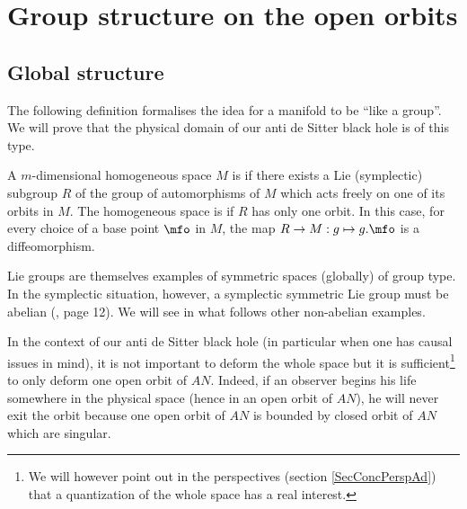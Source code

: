 \section{Group structure on the open orbits}
\label{SecGpStructOuvertOrb}

 \subsection{Global structure}

The following definition formalises the idea for a manifold to be ``like a group''. We will prove that the physical domain of our anti de Sitter black hole is of this type.
\begin{definition}
A $m$-dimensional homogeneous space $M$ is  if there exists a Lie (symplectic) subgroup $R$ of the group of automorphisms of $M$ which acts freely on one of its orbits in $M$. The homogeneous space is  if $R$ has only one orbit. In this case, for every choice of a base point $\mfo$ in $M$, the map $R\to M:g\mapsto g.\mfo$ is a diffeomorphism.
            \label{DefGlobGpType}
\end{definition}

Lie groups are themselves examples of symmetric spaces (globally) of group type.  In the symplectic situation, however, a symplectic symmetric Lie group must be abelian (\cite{ThzPierre}, page 12). We will see in what follows other non-abelian examples.  

In the context of our anti de Sitter black hole (in particular when one has causal issues in mind), it is not important to deform the whole space but it is sufficient\footnote{We will however point out in the perspectives (section \ref{SecConcPerspAd}) that a quantization of the whole space has a real interest.} to only deform one open orbit of $AN$. Indeed, if an observer begins his life somewhere in the physical space (hence in an open orbit of $AN$), he will never exit the orbit because one open orbit of $AN$ is bounded by closed orbit of $AN$ which are singular.

